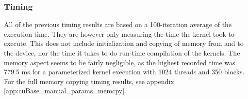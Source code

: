 \begin{table}[h!]
\centering
{}
\caption{Number of unequal results with various error tolerances\label{table:errorComparison}}
\end{table}

\subsubsection{Timing}
All of the previous timing results are based on a 100-iteration average of the execution time.
They are however only measuring the time the kernel took to execute.
This does not include initialization and copying of memory from and to the device, nor the time it takes to do run-time compilation of the kernels.
The memory aspect seems to be fairly negligible, as the highest recorded time was 779.5 ms for a parameterized kernel execution with 1024 threads and 350 blocks.
For the full memory copying timing results, see appendix \ref{app:cuBase_manual_params_memcpy}.

